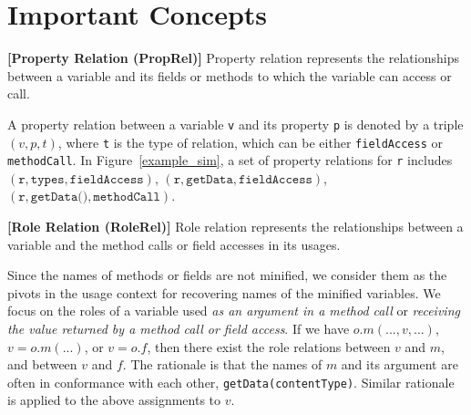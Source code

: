 \section{Important Concepts}
\label{concepts:sec}

\begin{definition}{\bf [Property Relation (PropRel)]}
Property relation represents the relationships between a variable and
its fields or methods to which the variable can access or call.
\end{definition}


A property relation between a variable \texttt{v} and its
property \texttt{p} is denoted by a triple $(v, p, t)$, 
where \texttt{t} is the type of relation, which can be 
either \texttt{fieldAccess} or \texttt{methodCall}.
In Figure~\ref{example_sim}, a set of property relations for \texttt{r}
includes $( \texttt{r}, \texttt{types}, \texttt{fieldAccess})$,
$( \texttt{r}, \texttt{getData}, \texttt{fieldAccess})$,
$( \texttt{r}, \texttt{getData()}, \texttt{methodCall})$.

\begin{definition}{\bf [Role Relation (RoleRel)]}
  Role relation represents the relationships between a variable and
  the method calls or field accesses in its usages.
\end{definition}

Since the names of methods or fields are not minified, we consider
them as the pivots in the usage context for recovering names of the
minified variables.
%
We focus on the roles of a variable used {\em as an argument in a method call}
 or {\em receiving the value returned by a method call or field access}.
%
If we have $o.m(...,v,...)$, $v = o.m(...)$, or $v = o.f$,
then there exist
the role relations between $v$ and $m$, and between $v$ and $f$. The
rationale is that the names of $m$ and its argument are often in
conformance with each other, \eg
\texttt{getData(contentType)}. Similar rationale is applied to the
above assignments to $v$.


